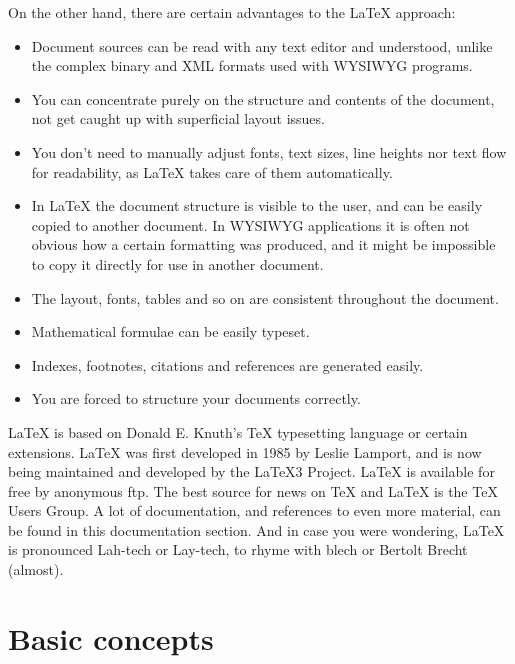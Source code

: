 On the other hand, there are certain advantages to the {\LaTeX} approach:
\begin{itemize}
\item Document sources can be read with any text editor and understood, unlike the complex binary and XML formats used with WYSIWYG programs.
\item You can concentrate purely on the structure and contents of the document, not get caught up with superficial layout issues.
\item You don't need to manually adjust fonts, text sizes, line heights nor text flow for readability, as {\LaTeX} takes care of them automatically.
\item In {\LaTeX} the document structure is visible to the user, and can be easily copied to another document. In WYSIWYG applications it is often not obvious how a certain formatting was produced, and it might be impossible to copy it directly for use in another document.
\item The layout, fonts, tables and so on are consistent throughout the document.
\item Mathematical formulae can be easily typeset.
\item Indexes, footnotes, citations and references are generated easily.
\item You are forced to structure your documents correctly.
\end{itemize}

{\LaTeX} is based on Donald E. Knuth's {\TeX} typesetting language or certain extensions. {\LaTeX} was first developed in 1985 by Leslie Lamport, and is now being maintained and developed by the \LaTeX3 Project. {\LaTeX}  is available for free by anonymous ftp. The best source for news on {\TeX} and {\LaTeX} is the {\TeX} Users Group. A lot of documentation, and references to even more material, can be found in this documentation section. And in case you were wondering, {\LaTeX} is pronounced Lah-tech or Lay-tech, to rhyme with blech or Bertolt Brecht (almost).

\section{Basic concepts}

